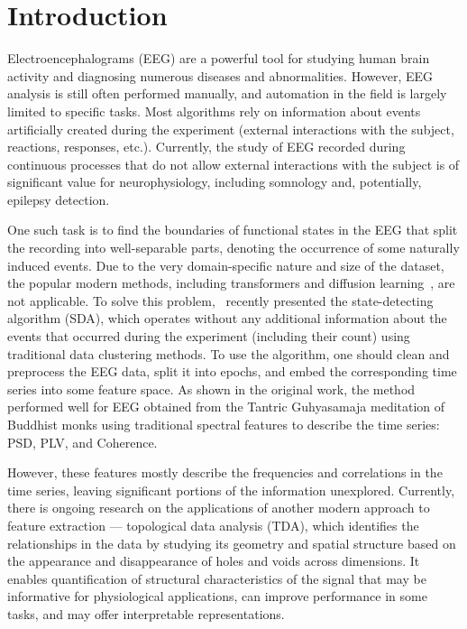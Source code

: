 \documentclass[pdflatex,sn-basic,Numbered]{sn-jnl}
\begin{document}
\section{Introduction}

Electroencephalograms (EEG) are a powerful tool for studying human brain activity and diagnosing numerous diseases and abnormalities. However, EEG analysis is still often performed manually, and automation in the field is largely limited to specific tasks. Most algorithms rely on information about events artificially created during the experiment (external interactions with the subject, reactions, responses, etc.). Currently, the study of EEG recorded during continuous processes that do not allow external interactions with the subject is of significant value for neurophysiology, including somnology and, potentially, epilepsy detection.

One such task is to find the boundaries of functional states in the EEG that split the recording into well-separable parts, denoting the occurrence of some naturally induced events. Due to the very domain-specific nature and size of the dataset, the popular modern methods, including transformers and diffusion learning~\cite{AGHAYENGEJEH2025100792,POURHAJIAGHAYENGEJEH2026114975}, are not applicable. To solve this problem,~\cite{SDA} recently presented the state-detecting algorithm (SDA), which operates without any additional information about the events that occurred during the experiment (including their count) using traditional data clustering methods. To use the algorithm, one should clean and preprocess the EEG data, split it into epochs, and embed the corresponding time series into some feature space. As shown in the original work, the method performed well for EEG obtained from the Tantric Guhyasamaja meditation of Buddhist monks using traditional spectral features to describe the time series: PSD, PLV, and Coherence.

However, these features mostly describe the frequencies and correlations in the time series, leaving significant portions of the information unexplored. Currently, there is ongoing research on the applications of another modern approach to feature extraction --- topological data analysis (TDA), which identifies the relationships in the data by studying its geometry and spatial structure based on the appearance and disappearance of holes and voids across dimensions. It enables quantification of structural characteristics of the signal that may be informative for physiological applications, can improve performance in some tasks, and may offer interpretable representations.
\end{document}

